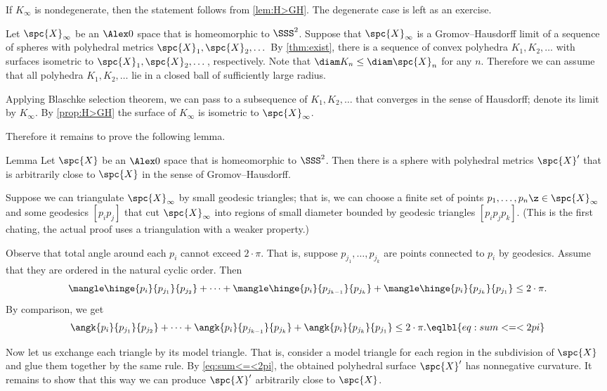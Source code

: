 If $K_\infty$ is nondegenerate, then the statement follows from \ref{lem:H>GH}.
The degenerate case is left as an exercise.

Let $\spc{X}_\infty$ be an $\Alex0$ space that is homeomorphic to $\SSS^2$.
Suppose that $\spc{X}_\infty$ is a Gromov--Hausdorff limit of a sequence of spheres with polyhedral metrics $\spc{X}_1,\spc{X}_2,\dots$
By \ref{thm:exist}, there is a sequence of convex polyhedra $K_1,K_2,\dots$ with surfaces isometric to $\spc{X}_1,\spc{X}_2,\dots$, respectively.
Note that  $\diam K_n\le \diam \spc{X}_n$ for any $n$.
Therefore we can assume that all polyhedra $K_1,K_2,\dots$ lie in a closed ball of sufficiently large radius.

Applying Blaschke selection theorem, we can pass to a subsequence of $K_1,K_2,\dots$ that converges in the sense of Hausdorff; denote its limit by $K_\infty$.
By \ref{prop:H>GH} the surface of $K_\infty$ is isometric to $\spc{X}_\infty$.

Therefore it remains to prove the following lemma.

\begin{thm}{Lemma}\label{lem:GH-approximation}
Let $\spc{X}$ be an $\Alex0$ space that is homeomorphic to $\SSS^2$.
Then there is a sphere with polyhedral metrics $\spc{X}'$
that is arbitrarily close to $\spc{X}$ in the sense of Gromov--Hausdorff.
\end{thm}

Suppose we can triangulate $\spc{X}_\infty$ by small geodesic triangles;
that is, we can choose a finite set of points $p_1,\dots,p_n\z\in \spc{X}_\infty$ and some geodesics $[p_ip_j]$ that cut $\spc{X}_\infty$ into regions of small diameter bounded by geodesic triangles $[p_ip_jp_k]$.
(This is the first chating, the actual proof uses a triangulation with a weaker property.)

Observe that total angle around each $p_i$ cannot exceed $2\cdot \pi$.
That is, suppose $p_{j_1},\dots,p_{j_k}$ are points connected to $p_i$ by geodesics.
Assume that they are ordered in the natural cyclic order.
Then
\[\mangle\hinge{p_i}{p_{j_1}}{p_{j_2}}+\dots+\mangle\hinge{p_i}{p_{j_{k-1}}}{p_{j_k}}+\mangle\hinge{p_i}{p_{j_{k}}}{p_{j_1}}\le 2\cdot\pi.\]
By comparison, we get
\[\angk{p_i}{p_{j_1}}{p_{j_2}}+\dots+
\angk{p_i}{p_{j_{k-1}}}{p_{j_k}}+\angk{p_i}{p_{j_{k}}}{p_{j_1}}\le 2\cdot\pi.\eqlbl{eq:sum<=<2pi}\]

Now let us exchange each triangle by its model triangle.
That is, consider a model triangle for each region in the subdivision of $\spc{X}$ and glue them together by the same rule.
By \ref{eq:sum<=<2pi}, the obtained polyhedral surface $\spc{X}'$ has nonnegative curvature.
It remains to show that this way we can produce $\spc{X}'$ arbitrarily close to $\spc{X}$.

